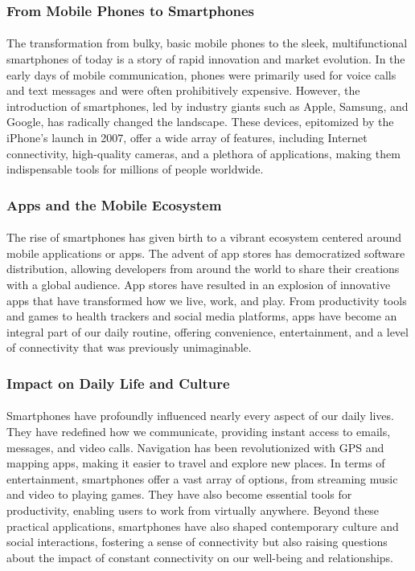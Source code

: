 \documentclass{book}
\begin{document}
\subsubsection*{From Mobile Phones to Smartphones}
\paragraph{}
The transformation from bulky, basic mobile phones to the sleek, multifunctional smartphones of today is a story of rapid innovation and market evolution. In the early days of mobile communication, phones were primarily used for voice calls and text messages and were often prohibitively expensive. However, the introduction of smartphones, led by industry giants such as Apple, Samsung, and Google, has radically changed the landscape. These devices, epitomized by the iPhone's launch in 2007, offer a wide array of features, including Internet connectivity, high-quality cameras, and a plethora of applications, making them indispensable tools for millions of people worldwide.

\subsubsection*{Apps and the Mobile Ecosystem}
\paragraph{}
The rise of smartphones has given birth to a vibrant ecosystem centered around mobile applications or apps. The advent of app stores has democratized software distribution, allowing developers from around the world to share their creations with a global audience. App stores have resulted in an explosion of innovative apps that have transformed how we live, work, and play. From productivity tools and games to health trackers and social media platforms, apps have become an integral part of our daily routine, offering convenience, entertainment, and a level of connectivity that was previously unimaginable.

\subsubsection*{Impact on Daily Life and Culture}
\paragraph{}
Smartphones have profoundly influenced nearly every aspect of our daily lives. They have redefined how we communicate, providing instant access to emails, messages, and video calls. Navigation has been revolutionized with GPS and mapping apps, making it easier to travel and explore new places. In terms of entertainment, smartphones offer a vast array of options, from streaming music and video to playing games. They have also become essential tools for productivity, enabling users to work from virtually anywhere. Beyond these practical applications, smartphones have also shaped contemporary culture and social interactions, fostering a sense of connectivity but also raising questions about the impact of constant connectivity on our well-being and relationships.
\end{document}
